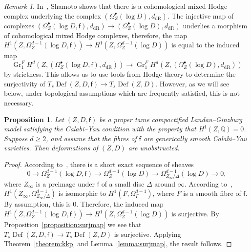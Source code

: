 \documentclass[10pt]{amsart}
\numberwithin{equation}{section}
\theoremstyle{plain}
\newtheorem{proposition}[theorem]{Proposition}
\theoremstyle{definition}
\theoremstyle{remark}
\newtheorem{remark}[theorem]{Remark}
\DeclareMathOperator{\Def}{Def}
\DeclareMathOperator{\Gr}{Gr}
\begin{document}
\begin{remark}
  In~\cite{shamoto2018hodge}, Shamoto shows that there is a cohomological mixed Hodge complex underlying the complex \((\Omega_Z^\bullet(\log D), d_\mathrm{dR})\). The injective map of complexes \((\Omega_Z^\bullet(\log D,\mathsf{f}),d_\mathrm{dR})\rightarrow (\Omega_Z^\bullet(\log D), d_\mathrm{dR})\) underlies a morphism of cohomological mixed Hodge complexes, therefore, the map \(H^1(Z,\Omega^{d-1}_Z(\log D,\mathsf{f}))\rightarrow H^1(Z,\Omega^{d-1}_Z(\log D))\) is equal to the induced map
  \[
    \Gr^F_1H^d(Z,(\Omega_Z^\bullet(\log D,\mathsf{f}),d_\mathrm{dR})) \rightarrow \Gr^F_1 H^d(Z,(\Omega_Z^\bullet(\log D), d_\mathrm{dR}))
  \]
  by strictness. This allows us to use tools from Hodge theory to determine the surjectivity of \(T_s \Def(Z,D,\mathsf{f}) \rightarrow T_s \Def(Z,D)\). However, as we will see below, under topological assumptions which are frequently satisfied, this is not necessary.
\end{remark}

\begin{proposition}\label{proposition:unoblog}
  Let \((Z,D,\mathsf{f})\) be a proper tame compactified Landau--Ginzburg model satisfying the Calabi--Yau condition with the property that \(H^1(Z,\mathbb{Q}) = 0\). Suppose \(d \geq 2\), and assume that the fibres of \(\mathsf{f}\) are generically smooth Calabi--Yau varieties. Then deformations of \((Z,D)\) are unobstructed.
\end{proposition}

\begin{proof}
  According to~\cite{shamoto2018hodge}, there is a short exact sequence of sheaves
  \[
    0 \rightarrow \Omega_Z^{d-1}(\log D,\mathsf{f}) \rightarrow \Omega_Z^{d-1}(\log D) \rightarrow \Omega_{Z_\infty/\Delta}^{d-1}(\log D)\rightarrow 0,
  \]
  where \(Z_\infty\) is a preimage under \(\mathsf{f}\) of a small disc \(\Delta\) around \(\infty\). According to~\cite{steenbrink1976limits}, \(H^1(Z_\infty,\Omega^{d-1}_{Z_\infty/\Delta})\) is isomorphic to \(H^1(F,\Omega^{d-1}_F)\), where \(F\) is a smooth fibre of \(\mathsf{f}\). By assumption, this is \(0\). Therefore, the induced map \(H^1(Z,\Omega_Z^{d-1}(\log D,\mathsf{f}))\rightarrow H^1(Z,\Omega_Z^{d-1}(\log D))\) is surjective. By Proposition~\ref{proposition:surjmap} we see that \(T_s \Def(Z,D,\mathsf{f}) \rightarrow T_s \Def(Z,D)\) is surjective. Applying Theorem~\ref{theorem:kkp} and Lemma~\ref{lemma:surjmap}, the result follows.
\end{proof}
\end{document}
